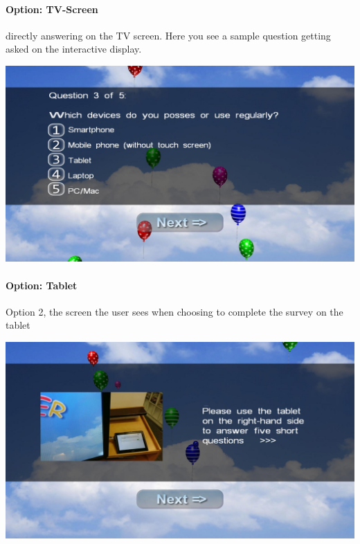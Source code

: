 \paragraph{Option: TV-Screen}
directly answering on the TV screen. Here you see a sample question getting asked on the interactive display.
 \label{screenshot:tv-option}

\begin{center}
    \includegraphics[width=\columnwidth]{img/screenshots/balloon-game/option-tv.jpg}
\end{center}




\clearpage

\paragraph{Option: Tablet}
\label{screenshot:tablet-option}
Option 2, the screen the user sees when choosing to complete the survey on the tablet

\begin{center}
    \includegraphics[width=\columnwidth]{img/screenshots/balloon-game/option-tablet.jpg}
\end{center}



